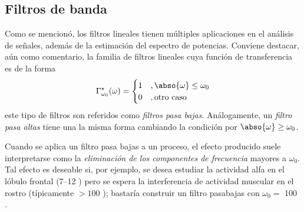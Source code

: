 
\subsection{Filtros de banda}

Como se mencionó, los filtros lineales tienen múltiples aplicaciones en el análisis de señales, además de la estimación del espectro de potencias.
%
Conviene destacar, aún como comentario, la familia de filtros lineales cuya función de transferencia es de la forma
\begin{equation}
\Gamma_{\omega_0}^{\star} (\omega) = \begin{cases}
1 &, \abso{\omega} \leq \omega_0 \\
0 &, \text{otro caso}
\end{cases}
\end{equation}
este tipo de filtros son referidos como \textit{filtros pasa bajas}.%
%
Análogamente, un \textit{filtro pasa altas} tiene una la misma forma cambiando la condición por $\abso{\omega} \geq \omega_0$.

Cuando se aplica un filtro pasa bajas a un proceso, el efecto producido suele interpretarse como la \textit{eliminación de los componentes de frecuencia} mayores a $\omega_0$. 
%
Tal efecto es deseable si, por ejemplo, se desea estudiar la actividad alfa en el lóbulo frontal (7--12 \hz) pero se espera la interferencia de actividad muscular en el rostro (típicamente $>100$ \hz); bastaría construir un filtro pasabajas con $\omega_0 = $ 100 \hz.

